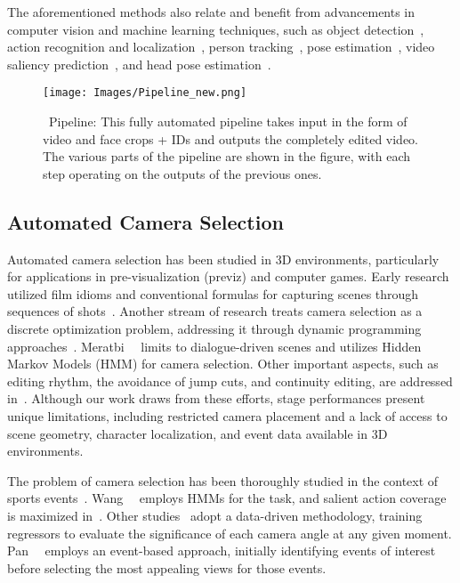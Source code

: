 The aforementioned methods also relate and benefit from advancements in computer vision and machine learning techniques, such as object detection~\cite{yolo_repo}, action recognition and localization~\cite{acarnet,slowfast}, person tracking~\cite{botsort,cao2023observation}, pose estimation~\cite{yolov8}, video saliency prediction~\cite{dhf1k,vinet}, and head pose estimation~\cite{kao2023toward}. 

\begin{figure*}[t]
\centering
\texttt{[image: Images/Pipeline\_new.png]}
\caption{\ourmethod~Pipeline: This fully automated pipeline takes input in the form of video and face crops + IDs and outputs the completely edited video. The various parts of the pipeline are shown in the figure, with each step operating on the outputs of the previous ones.}
\label{fig:pipeline}
\end{figure*}

\subsection{Automated Camera Selection}

Automated camera selection has been studied in 3D environments, particularly for applications in pre-visualization (previz) and computer games. Early research~\cite{christianson1996declarative, he1996virtual} utilized film idioms and conventional formulas for capturing scenes through sequences of shots~\cite{arijon1976grammar}. Another stream of research treats camera selection as a discrete optimization problem, addressing it through dynamic programming approaches~\cite{lino2011computational, galvane2015continuity, merabti2016virtual}. Meratbi~\etal~\cite{merabti2016virtual} limits to dialogue-driven scenes and utilizes Hidden Markov Models (HMM) for camera selection. Other important aspects, such as editing rhythm, the avoidance of jump cuts, and continuity editing, are addressed in~\cite{galvane2015continuity}. Although our work draws from these efforts, stage performances present unique limitations, including restricted camera placement and a lack of access to scene geometry, character localization, and event data available in 3D environments.


The problem of camera selection has been thoroughly studied in the context of sports events~\cite{wang2008automatic,chen2010personalized,ChenWHCSG13,chen2018camera,pan2021smart}. Wang~\etal~\cite{wang2008automatic} employs HMMs for the task, and salient action coverage is maximized in~\cite{chen2010personalized}. Other studies~\cite{ChenWHCSG13,chen2018camera} adopt a data-driven methodology, training regressors to evaluate the significance of each camera angle at any given moment. Pan~\etal~\cite{pan2021smart} employs an event-based approach, initially identifying events of interest before selecting the most appealing views for those events.

